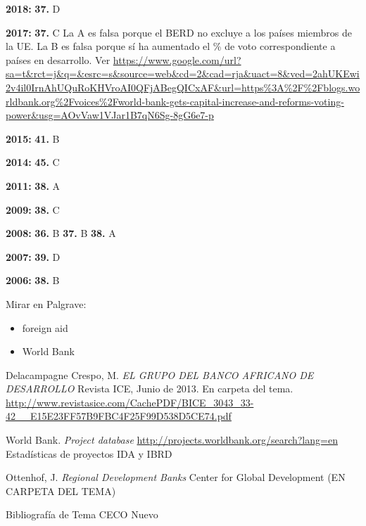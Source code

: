 \documentclass{nuevotema}
\begin{document}
\textbf{2018:} \textbf{37.} D

\textbf{2017:} \textbf{37.} C La A es falsa porque el BERD no excluye a los países miembros de la UE. La B es falsa porque sí ha aumentado el \% de voto correspondiente a países en desarrollo. Ver \url{https://www.google.com/url?sa=t&rct=j&q=&esrc=s&source=web&cd=2&cad=rja&uact=8&ved=2ahUKEwi2v4il0IrnAhUQuRoKHVroAI0QFjABegQICxAF&url=https\%3A\%2F\%2Fblogs.worldbank.org\%2Fvoices\%2Fworld-bank-gets-capital-increase-and-reforms-voting-power&usg=AOvVaw1VJar1B7qN6Sg-8gG6e7-p}

\textbf{2015:} \textbf{41.} B

\textbf{2014:} \textbf{45.} C

\textbf{2011:} \textbf{38.} A

\textbf{2009:} \textbf{38.} C

\textbf{2008:} \textbf{36.} B \textbf{37.} B \textbf{38.} A

\textbf{2007:} \textbf{39.} D

\textbf{2006:} \textbf{38.} B

\bibliografia

Mirar en Palgrave:
\begin{itemize}
	\item foreign aid
	\item World Bank
\end{itemize}


Delacampagne Crespo, M. \textit{EL GRUPO DEL BANCO AFRICANO DE DESARROLLO} Revista ICE, Junio de 2013. En carpeta del tema. \url{http://www.revistasice.com/CachePDF/BICE\_3043\_33-42\_\_E15E23FF57B9FBC4F25F99D538D5CE74.pdf}

World Bank. \textit{Project database} \url{http://projects.worldbank.org/search?lang=en} Estadísticas de proyectos IDA y IBRD

Ottenhof, J. \textit{Regional Development Banks} Center for Global Development (EN CARPETA DEL TEMA)

Bibliografía de Tema CECO Nuevo
\end{document}
